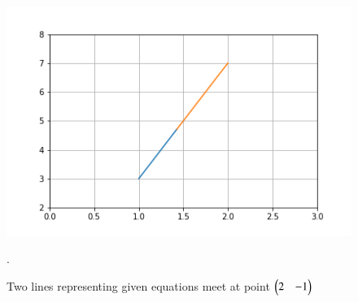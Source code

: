 \documentclass[journal,12pt,twocolumn]{IEEEtran}
\renewcommand\thesection{\arabic{section}}
\begin{document}
\begin{enumerate}[label=\thesection.\arabic*.,ref=\thesection.\theenumi]
\begin{figure}[h]
\includegraphics[width=\columnwidth]{line division.png}
\label{Fig 1.1}
\caption{Two lines representing given equations meet at point $\begin{pmatrix}2 & -1\end{pmatrix}$ }.
\end{figure}
\end{enumerate}
\end{document}
